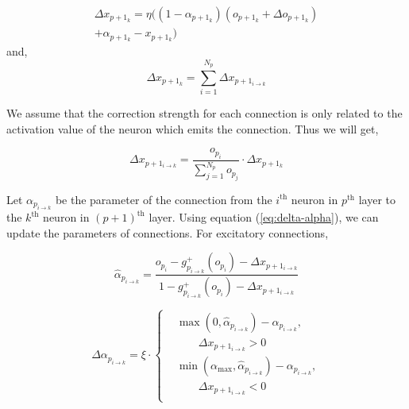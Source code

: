 \documentclass[conference]{IEEEtran}
\begin{document}
\begin{multline}
    \Delta x_{p+1_k} = \eta((1-\alpha_{p+1_k})(o_{p+1_k}+\Delta o_{p+1_k})\\
        +\alpha_{p+1_k}-x_{p+1_k})
    \label{eq:delta-x-real}
\end{multline}
and,
\begin{equation}
    \Delta x_{p+1_k} = \sum_{i=1}^{N_p}\Delta x_{p+1_{i\rightarrow{k}}}
    \label{eq:delta-sum}
\end{equation}

We assume that the correction strength for each connection is only related
to the activation value of the neuron which emits the connection. Thus we
will get,

\begin{equation}
    \Delta x_{p+1_{i\rightarrow{k}}} = \frac{o_{p_i}}{\sum_{j=1}^{N_p}o_{p_j}}\cdot\Delta x_{p+1_k}
    \label{eq:conn-error}
\end{equation}

Let $\alpha_{p_{i\rightarrow{k}}}$ be the parameter of the connection from the
$i^{\text{th}}$ neuron in $p^{\text{th}}$ layer to the $k^{\text{th}}$ neuron in $(p+1)^{\text{th}}$ layer.
Using equation (\ref{eq:delta-alpha}), we can update the parameters of connections.
For excitatory connections,

\begin{equation}
    \hat{\alpha}_{p_{i\rightarrow{k}}}=
        \frac{ o_{p_i}-g^{+}_{p_{i\rightarrow{k}}}(o_{p_i})-\Delta x_{p+1_{i\rightarrow{k}}} }{
        1-g^{+}_{p_{i\rightarrow{k}}}(o_{p_i})-\Delta x_{p+1_{i\rightarrow{k}}} }
    \label{eq:alpha-plus-pos}
\end{equation}

\begin{equation}
    \Delta\alpha_{p_{i\rightarrow{k}}} =\xi\cdot
    \left\{
        \begin{aligned}
            &\max\left(0,\hat{\alpha}_{p_{i\rightarrow{k}}}\right)-\alpha_{p_{i\rightarrow{k}}},\\
            &\quad\quad\Delta x_{p+1_{i\rightarrow{k}}}>0\\
            &\min\left(\alpha_{\max},\hat{\alpha}_{p_{i\rightarrow{k}}}\right)-\alpha_{p_{i\rightarrow{k}}},\\
            &\quad\quad\Delta x_{p+1_{i\rightarrow{k}}}<0\\
        \end{aligned}
        \right.
    \label{eq:conn-update-pos}
\end{equation}
\end{document}
